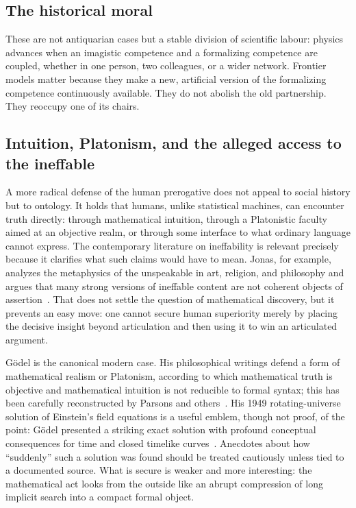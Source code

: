 \documentclass[
  aps,
  reprint,
  superscriptaddress,
  floatfix,
  nofootinbib,
  longbibliography
]{revtex4-2}
\begin{document}
\subsection{The historical moral}

These are not antiquarian cases but a stable division of scientific labour:
physics advances when an imagistic competence and a formalizing competence are
coupled, whether in one person, two colleagues, or a wider network. Frontier
models matter because they make a new, artificial version of the formalizing
competence continuously available. They do not abolish the old partnership. They
reoccupy one of its chairs.

\subsection{Intuition, Platonism, and the alleged access to the ineffable}
\label{sec:intuition-ineffability}

A more radical defense of the human prerogative does not appeal to social
history but to ontology. It holds that humans, unlike statistical machines, can
encounter truth directly: through mathematical intuition, through a Platonistic
faculty aimed at an objective realm, or through some interface to what ordinary
language cannot express. The contemporary literature on ineffability is relevant
precisely because it clarifies what such claims would have to mean. Jonas, for
example, analyzes the metaphysics of the unspeakable in art, religion, and
philosophy and argues that many strong versions of ineffable content are not
coherent objects of assertion~\cite{Jonas-ineffability}. That does not settle the
question of mathematical discovery, but it prevents an easy move: one cannot
secure human superiority merely by placing the decisive insight beyond
articulation and then using it to win an articulated argument.

G\"odel is the canonical modern case. His philosophical writings defend a form
of mathematical realism or Platonism, according to which mathematical truth is
objective and mathematical intuition is not reducible to formal syntax; this has
been carefully reconstructed by Parsons and others~\cite{godel1964cantor,parsons1995platonism}. His 1949 rotating-universe solution of Einstein's field
equations is a useful emblem, though not proof, of the point: G\"odel presented a
striking exact solution with profound conceptual consequences for time and
closed timelike curves~\cite{goedel1949cosmological}. Anecdotes about how
``suddenly'' such a solution was found should be treated cautiously unless tied
to a documented source. What is secure is weaker and more interesting: the
mathematical act looks from the outside like an abrupt compression of long
implicit search into a compact formal object.
\end{document}
